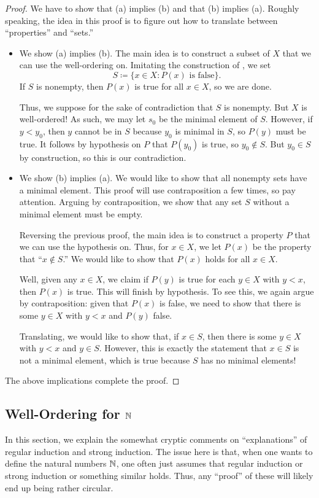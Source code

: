 \documentclass[../main.tex]{subfiles}
\begin{document}
\begin{proof}
    We have to show that (a) implies (b) and that (b) implies (a). Roughly speaking, the idea in this proof is to figure out how to translate between ``properties'' and ``sets.''
    \begin{itemize}
        \item We show (a) implies (b). The main idea is to construct a subset of $X$ that we can use the well-ordering on. Imitating the construction of , we set
        \[S\coloneqq\{x\in X:P(x)\text{ is false}\}.\]
        If $S$ is nonempty, then $P(x)$ is true for all $x\in X$, so we are done.
    
        Thus, we suppose for the sake of contradiction that $S$ is nonempty. But $X$ is well-ordered! As such, we may let $s_0$ be the minimal element of $S$. However, if $y<y_0$, then $y$ cannot be in $S$ because $y_0$ is minimal in $S$, so $P(y)$ must be true. It follows by hypothesis on $P$ that $P(y_0)$ is true, so $y_0\notin S$. But $y_0\in S$ by construction, so this is our contradiction.

        \item We show (b) implies (a). We would like to show that all nonempty sets have a minimal element. This proof will use contraposition a few times, so pay attention. Arguing by contraposition, we show that any set $S$ without a minimal element must be empty.
        
        Reversing the previous proof, the main idea is to construct a property $P$ that we can use the hypothesis on. Thus, for $x\in X$, we let $P(x)$ be the property that ``$x\notin S$.'' We would like to show that $P(x)$ holds for all $x\in X$.

        Well, given any $x\in X$, we claim if $P(y)$ is true for each $y\in X$ with $y<x$, then $P(x)$ is true. This will finish by hypothesis. To see this, we again argue by contraposition: given that $P(x)$ is false, we need to show that there is some $y\in X$ with $y<x$ and $P(y)$ false.

        Translating, we would like to show that, if $x\in S$, then there is some $y\in X$ with $y<x$ and $y\in S$. However, this is exactly the statement that $x\in S$ is not a minimal element, which is true because $S$ has no minimal elements!
    \end{itemize}
    The above implications complete the proof.
\end{proof}

\subsection{Well-Ordering for \texorpdfstring{$\mathbb N$}{N}}
In this section, we explain the somewhat cryptic comments on ``explanations'' of regular induction and strong induction. The issue here is that, when one wants to define the natural numbers $\mathbb N$, one often just assumes that regular induction or strong induction or something similar holds. Thus, any ``proof'' of these will likely end up being rather circular.
\end{document}
